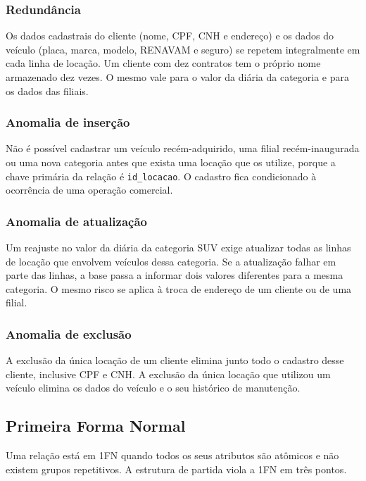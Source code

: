 \subsubsection{Redund\^ancia}
Os dados cadastrais do cliente (nome, CPF, CNH e endere\c{c}o) e os dados do ve\'iculo (placa, marca, modelo, RENAVAM e seguro) se repetem integralmente em cada linha de loca\c{c}\~ao. Um cliente com dez contratos tem o pr\'oprio nome armazenado dez vezes. O mesmo vale para o valor da di\'aria da categoria e para os dados das filiais.

\subsubsection{Anomalia de inser\c{c}\~ao}
N\~ao \'e poss\'ivel cadastrar um ve\'iculo rec\'em-adquirido, uma filial rec\'em-inaugurada ou uma nova categoria antes que exista uma loca\c{c}\~ao que os utilize, porque a chave prim\'aria da rela\c{c}\~ao \'e \texttt{id\_locacao}. O cadastro fica condicionado \`a ocorr\^encia de uma opera\c{c}\~ao comercial.

\subsubsection{Anomalia de atualiza\c{c}\~ao}
Um reajuste no valor da di\'aria da categoria SUV exige atualizar todas as linhas de loca\c{c}\~ao que envolvem ve\'iculos dessa categoria. Se a atualiza\c{c}\~ao falhar em parte das linhas, a base passa a informar dois valores diferentes para a mesma categoria. O mesmo risco se aplica \`a troca de endere\c{c}o de um cliente ou de uma filial.

\subsubsection{Anomalia de exclus\~ao}
A exclus\~ao da \'unica loca\c{c}\~ao de um cliente elimina junto todo o cadastro desse cliente, inclusive CPF e CNH. A exclus\~ao da \'unica loca\c{c}\~ao que utilizou um ve\'iculo elimina os dados do ve\'iculo e o seu hist\'orico de manuten\c{c}\~ao.

\subsection{Primeira Forma Normal}

Uma rela\c{c}\~ao est\'a em 1FN quando todos os seus atributos s\~ao at\^omicos e n\~ao existem grupos repetitivos. A estrutura de partida viola a 1FN em tr\^es pontos.

